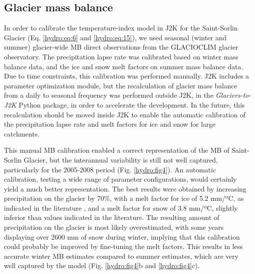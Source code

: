 \subsection{Glacier mass balance}

In order to calibrate the temperature-index model in J2K for the Saint-Sorlin Glacier (Eq. \ref{hydro:eq:6} and \ref{hydro:eq:15}), we used seasonal (winter and summer) glacier-wide MB direct observations from the GLACIOCLIM glacier observatory. The precipitation lapse rate was calibrated based on winter mass balance data, and the ice and snow melt factors on summer mass balance data. Due to time constraints, this calibration was performed manually. J2K includes a parameter optimization module, but the recalculation of glacier mass balance from a daily to seasonal frequency was performed outside J2K, in the \textit{Glaciers-to-J2K} Python package, in order to accelerate the development. In the future, this recalculation should be moved inside J2K to enable the automatic calibration of the precipitation lapse rate and melt factors for ice and snow for large catchments.

This manual MB calibration enabled a correct representation of the MB of Saint-Sorlin Glacier, but the interannual variability is still not well captured, particularly for the 2005-2008 period (Fig. \ref{hydro:fig4}). An automatic calibration, testing a wide range of parameter configurations, would certainly yield a much better representation. The best results were obtained by increasing precipitation on the glacier by 70\%, with a melt factor for ice of 5.2 mm/ºC, as indicated in the literature \citep{reveillet_which_2017}, and a melt factor for snow of 3.8 mm/ºC, slightly inferior than values indicated in the literature. The resulting amount of precipitation on the glacier is most likely overestimated, with some years displaying over 2600 mm of snow during winter, implying that this calibration could probably be improved by fine-tuning the melt factors. This results in less accurate winter MB estimates compared to summer estimates, which are very well captured by the model (Fig. \ref{hydro:fig4}b and \ref{hydro:fig4}c). 

